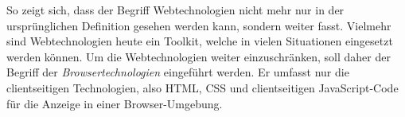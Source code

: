 So zeigt sich, dass der Begriff Webtechnologien nicht mehr nur in der ursprünglichen Definition gesehen werden kann,
sondern weiter fasst. Vielmehr sind Webtechnologien heute ein Toolkit, welche in vielen Situationen eingesetzt werden
können. Um die Webtechnologien weiter einzuschränken, soll daher der Begriff der \emph{Browsertechnologien} eingeführt werden. 
Er umfasst nur die clientseitigen Technologien, also HTML, CSS und clientseitigen JavaScript-Code 
für die Anzeige in einer Browser-Umgebung.

